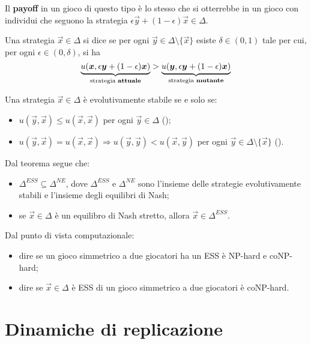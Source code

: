 Il \textbf{payoff} in un gioco di questo tipo è lo stesso che si otterrebbe in un gioco con individui che seguono la strategia $\epsilon \vec{y} + (1 - \epsilon) \vec{x} \in \Delta$.
\begin{mydef}
	Una strategia $\vec{x} \in \Delta$ si dice  se per ogni $\vec{y} \in \Delta \setminus \{\vec{x}\}$ esiste $\delta \in (0, 1)$ tale per cui, per ogni $\epsilon \in (0, \delta)$, si ha
	\begin{displaymath}
		\underbrace{u(\vec{x}, \epsilon \vec{y} + (1 - \epsilon) \vec{x})}_{\text{strategia \textbf{attuale}}} > \underbrace{u(\vec{y}, \epsilon \vec{y} + (1 - \epsilon) \vec{x})}_{\text{strategia \textbf{mutante}}}
	\end{displaymath}
\end{mydef}
\begin{thm}
	Una strategia $\vec{x} \in \Delta$ è evolutivamente stabile se e solo se:
	\begin{itemize}
		\item $u(\vec{y}, \vec{x}) \leq u(\vec{x}, \vec{x})$ per ogni $\vec{y} \in \Delta$ ();
		\item $u(\vec{y}, \vec{x}) = u(\vec{x}, \vec{x}) \Rightarrow u(\vec{y}, \vec{y}) < u(\vec{x}, \vec{y})$ per ogni $\vec{y} \in \Delta \setminus \{\vec{x}\}$ ().
	\end{itemize}
\end{thm}

\noindent Dal teorema segue che:
\begin{itemize}
	\item $\Delta^{ESS} \subseteq \Delta^{NE}$, dove $\Delta^{ESS}$ e $\Delta^{NE}$ sono l'insieme delle strategie evolutivamente stabili e l'insieme degli equilibri di Nash;
	\item se $\vec{x} \in \Delta$ è un equilibro di Nash stretto, allora $\vec{x} \in \Delta^{ESS}$.
\end{itemize}
Dal punto di vista computazionale:
\begin{itemize}
	\item dire se un gioco simmetrico a due giocatori ha un ESS è NP-hard e coNP-hard;
	\item dire se $\vec{x} \in \Delta$ è ESS di un gioco simmetrico a due giocatori è coNP-hard.
\end{itemize}

\section{Dinamiche di replicazione}

